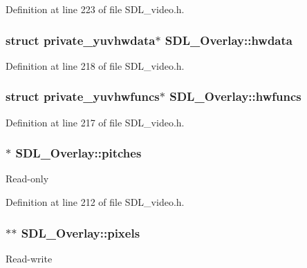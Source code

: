 Definition at line 223 of file S\+D\+L\+\_\+video.\+h.

\hypertarget{struct_s_d_l___overlay_acc40482a067d5c106747dab61bcee3c4}{}
\subsubsection[{hwdata}]{\setlength{\rightskip}{0pt plus 5cm}struct private\+\_\+yuvhwdata$\ast$ S\+D\+L\+\_\+\+Overlay\+::hwdata}\label{struct_s_d_l___overlay_acc40482a067d5c106747dab61bcee3c4}


Definition at line 218 of file S\+D\+L\+\_\+video.\+h.

\hypertarget{struct_s_d_l___overlay_aba6df163c475c57ba729bd9b86f87963}{}
\subsubsection[{hwfuncs}]{\setlength{\rightskip}{0pt plus 5cm}struct private\+\_\+yuvhwfuncs$\ast$ S\+D\+L\+\_\+\+Overlay\+::hwfuncs}\label{struct_s_d_l___overlay_aba6df163c475c57ba729bd9b86f87963}


Definition at line 217 of file S\+D\+L\+\_\+video.\+h.

\hypertarget{struct_s_d_l___overlay_ad88bb773013ff535c647af38760c69e8}{}
\subsubsection[{pitches}]{$\ast$ S\+D\+L\+\_\+\+Overlay\+::pitches}\label{struct_s_d_l___overlay_ad88bb773013ff535c647af38760c69e8}
Read-\/only 

Definition at line 212 of file S\+D\+L\+\_\+video.\+h.

\hypertarget{struct_s_d_l___overlay_a782b8904e618e8a1c2c8299c3994ec8f}{}
\subsubsection[{pixels}]{$\ast$$\ast$ S\+D\+L\+\_\+\+Overlay\+::pixels}\label{struct_s_d_l___overlay_a782b8904e618e8a1c2c8299c3994ec8f}
Read-\/write 

